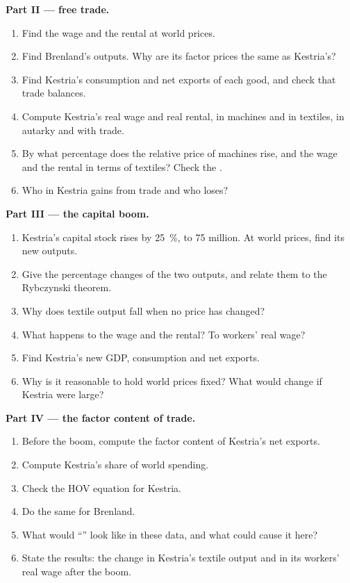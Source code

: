 \begin{problem}
\medskip\noindent\textbf{Part II --- free trade.}
\begin{enumerate}[resume]
\item Find the wage and the rental at world prices.
\item Find Brenland's outputs. Why are its factor prices the same as Kestria's?
\item Find Kestria's consumption and net exports of each good, and check that
trade balances.
\item Compute Kestria's real wage and real rental, in machines and in textiles,
in autarky and with trade.
\item By what percentage does the relative price of machines rise, and the
wage and the rental in terms of textiles? Check the .
\item Who in Kestria gains from trade and who loses?
\end{enumerate}

\medskip\noindent\textbf{Part III --- the capital boom.}
\begin{enumerate}[resume]
\item Kestria's capital stock rises by 25~\%, to 75 million. At world prices,
find its new outputs.
\item Give the percentage changes of the two outputs, and relate them to the
Rybczynski theorem.
\item Why does textile output fall when no price has changed?
\item What happens to the wage and the rental? To workers' real wage?
\item Find Kestria's new GDP, consumption and net exports.
\item Why is it reasonable to hold world prices fixed? What would change if
Kestria were large?
\end{enumerate}

\medskip\noindent\textbf{Part IV --- the factor content of trade.}
\begin{enumerate}[resume]
\item Before the boom, compute the factor content of Kestria's net exports.
\item Compute Kestria's share of world spending.
\item Check the HOV equation for Kestria.
\item Do the same for Brenland.
\item What would ``'' look like in these data, and what could cause
it here?
\item State the results: the change in Kestria's textile output and in its
workers' real wage after the boom.
\end{enumerate}
\end{problem}
